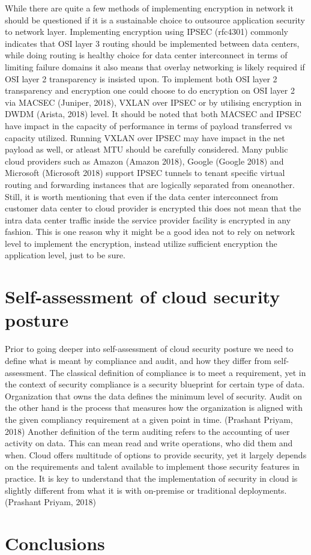 \documentclass{article}
\begin{document}
While there are quite a few methods of implementing encryption in network it should be questioned if it is a sustainable choice to outsource application security to network layer. Implementing encryption using IPSEC (rfc4301) commonly indicates that OSI layer 3 routing should be implemented between data centers, while doing routing is healthy choice for data center interconnect in terms of limiting failure domains it also means that overlay networking is likely required if OSI layer 2 transparency is insisted upon. To implement both OSI layer 2 transparency and encryption one could choose to do encryption on OSI layer 2 via MACSEC (Juniper, 2018), VXLAN over IPSEC or by utilising encryption in DWDM (Arista, 2018) level. It should be noted that both MACSEC and IPSEC have impact in the capacity of performance in terms of payload transferred vs capacity utilized. Running VXLAN over IPSEC may have impact in the net payload as well, or atleast MTU should be carefully considered. Many public cloud providers such as Amazon (Amazon 2018), Google (Google 2018) and Microsoft (Microsoft 2018) support IPSEC tunnels to tenant specific virtual routing and forwarding instances that are logically separated from oneanother. Still, it is worth mentioning that even if the data center interconnect from customer data center to cloud provider is encrypted this does not mean that the intra data center traffic inside the service provider facility is encrypted in any fashion. This is one reason why it might be a good idea not to rely on network level to implement the encryption, instead utilize sufficient encryption the application level, just to be sure.
\section{Self-assessment of cloud security posture}
Prior to going deeper into self-assessment of cloud security posture we need to define what is meant by compliance and audit, and how they differ from self-assessment.
The classical definition of compliance is to meet a requirement, yet in the context of security compliance is a security blueprint for certain type of data. Organization that owns the data defines the minimum level of security.
Audit on the other hand is the process that measures how the organization is aligned with the given compliancy requirement at a given point in time. (Prashant Priyam, 2018)
Another definition of the term auditing refers to the accounting of user activity on data. This can mean read and write operations, who did them and when.
Cloud offers multitude of options to provide security, yet it largely depends on the requirements and talent available to implement those security features in practice. It is key to understand that the implementation of security in cloud is slightly different from what it is with on-premise or traditional deployments. (Prashant Priyam, 2018)
 
\section{Conclusions}
\end{document}
